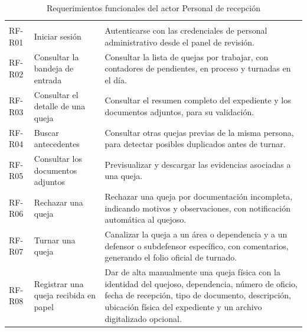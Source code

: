 	\small
	\renewcommand{\arraystretch}{1.2}
	
	\begin{longtable}{|p{1.5cm}|p{3.6cm}|p{9.0cm}|}
		\caption{Requerimientos funcionales del actor Personal de recepción}
		\label{tab:rf_recepcion} \\
		\hline
		\rowcolor{headerblue}
		\headercell{ID} & \headercell{Requerimiento} & \headercell{Descripción} \\
		\hline
		\endfirsthead
	
		\hline
		\rowcolor{headerblue}
		\headercell{ID} & \headercell{Requerimiento} & \headercell{Descripción} \\
		\hline
		\endhead
	
		RF-R01 & Iniciar sesión & Autenticarse con las credenciales de personal administrativo desde
		el panel de revisión. \\ \hline
	
		RF-R02 & Consultar la bandeja de entrada & Consultar la lista de quejas por trabajar, con
		contadores de pendientes, en proceso y turnadas en el día. \\ \hline
	
		RF-R03 & Consultar el detalle de una queja & Consultar el resumen completo del expediente y
		los documentos adjuntos, para su validación. \\ \hline
	
		RF-R04 & Buscar antecedentes & Consultar otras quejas previas de la misma persona, para
		detectar posibles duplicados antes de turnar. \\ \hline
	
		RF-R05 & Consultar los documentos adjuntos & Previsualizar y descargar las evidencias
		asociadas a una queja. \\ \hline
	
		RF-R06 & Rechazar una queja & Rechazar una queja por documentación incompleta, indicando
		motivos y observaciones, con notificación automática al quejoso. \\ \hline
	
		RF-R07 & Turnar una queja & Canalizar la queja a un área o dependencia y a un defensor o
		subdefensor específico, con comentarios, generando el folio oficial de turnado. \\ \hline
	
		RF-R08 & Registrar una queja recibida en papel & Dar de alta manualmente una queja física
		con la identidad del quejoso, dependencia, número de oficio, fecha de recepción, tipo de
		documento, descripción, ubicación física del expediente y un archivo digitalizado opcional.
		\\ \hline
	

\end{longtable}
